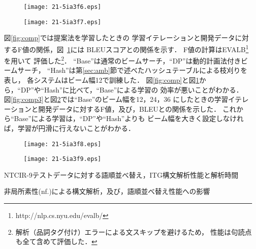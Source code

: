 \documentclass[japanese]{jnlp_1.4}
\begin{document}
\begin{figure}[b]
\setlength{\captionwidth}{0.45\textwidth}
\begin{minipage}{0.45\textwidth}
\begin{center}
\texttt{[image: 21-5ia3f6.eps]}
\end{center}
\label{fig:comp}
\end{minipage}
\hfill
\begin{minipage}{0.45\textwidth}
\begin{center}
\texttt{[image: 21-5ia3f7.eps]}
\end{center}
\label{fig:comp2}
\end{minipage}
\end{figure}

図\ref{fig:comp}では提案法を学習したときの
学習イテレーションと開発データに対するF値の関係，図~\ref{fig:comp2}には
BLEUスコア\cite{Papineni:02}との関係を示す．
F値の計算はEVALB\footnote{http://nlp.cs.nyu.edu/evalb/}を用いて
評価した\footnote{解析（品詞タグ付け）エラーによる文スキップを避けるため，
性能は句読点も全て含めて評価した．}．
``Base''は通常のビームサーチ，``DP''は動的計画法付きビームサーチ，
``Hash''は第\ref{sec:amb}節で述べたハッシュテーブルによる枝刈りを表し，
各システムはビーム幅12で訓練した．
図\ref{fig:comp}と図\ref{fig:comp2}から，``DP''や``Hash''に比べて，``Base''による学習の
効率が悪いことがわかる．
図\ref{fig:comp3}と図\ref{fig:comp4}では``Base''のビーム幅を12，24，36
にしたときの学習イテレーションと開発データに対するF値，及び，BLEUとの関係を示した．
これから``Base''による学習は，``DP''や``Hash''よりも
ビーム幅を大きく設定しなければ，学習が円滑に行えないことがわかる．

\begin{figure}[b]
\setlength{\captionwidth}{0.45\textwidth}
\begin{minipage}{0.45\textwidth}
\begin{center}
\texttt{[image: 21-5ia3f8.eps]}
\end{center}
\label{fig:comp3}
\end{minipage}
\hfill
\begin{minipage}{0.45\textwidth}
\begin{center}
\texttt{[image: 21-5ia3f9.eps]}
\end{center}
\label{fig:comp4}
\end{minipage}
\end{figure}
\begin{table}[b]
\caption{NTCIR-9テストデータに対する語順並べ替え，ITG構文解析性能と解析時間}
\label{tab:f-m}

\end{table}
\begin{table}[b]
\caption{非局所素性(nf.)による構文解析，及び，語順並べ替え性能への影響}
\label{tab:re1}

\end{table}
\end{document}
